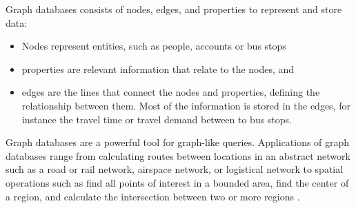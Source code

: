 Graph databases consists of nodes, edges, and properties to represent and store data:
\begin{itemize}
\item Nodes represent entities, such as people, accounts or bus stops
\item properties are relevant information that relate to the nodes, and 
\item edges are the lines that connect the nodes and properties, defining the relationship between them. Most of the information is stored in the edges, for instance the travel time or travel demand between to bus stops. 
\end{itemize}

Graph databases are a powerful tool for graph-like queries. Applications of graph databases range from calculating routes between locations in an abstract network such as a road or rail network, airspace network, or logistical network to spatial operations such as find all points of interest in a bounded area, find the center of a region, and calculate the intersection between two or more regions \citep{robinson13}.






\par %


\par

